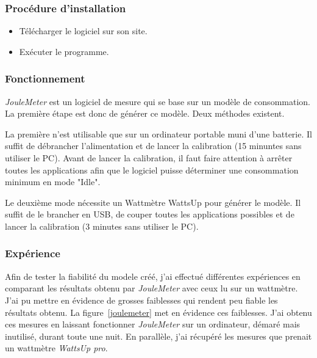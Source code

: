 \documentclass[a4paper, 11pt]{report}
\begin{document}
			\subsubsection{Procédure d'installation}
\begin{itemize}
	\item Télécharger le logiciel sur son site.
	\item Exécuter le programme.
\end{itemize}

			\subsubsection{Fonctionnement}
\textit{JouleMeter} est un logiciel de mesure qui se base sur un modèle de consommation. La première étape est donc de générer ce modèle. Deux méthodes existent.

La première n’est utilisable que sur un ordinateur portable muni d’une batterie. Il suffit de débrancher l’alimentation et de lancer la calibration (15 minuntes sans utiliser le PC). Avant de lancer la calibration, il faut faire attention à arrêter toutes les applications afin que le logiciel puisse déterminer une consommation minimum en mode "Idle".

Le deuxième mode nécessite un Wattmètre WattsUp pour générer le modèle. Il suffit de le brancher en USB, de couper toutes les applications possibles et de lancer la calibration (3 minutes sans utiliser le PC).

			\subsubsection{Expérience}
Afin de tester la fiabilité du modele créé, j'ai effectué différentes expériences en comparant les résultats obtenu par \textit{JouleMeter} avec ceux lu sur un wattmètre. J'ai pu mettre en évidence de grosses faiblesses qui rendent peu fiable les résultats obtenu. La figure~\ref{joulemeter} met en évidence ces faiblesses. J'ai obtenu ces mesures en laissant fonctionner \textit{JouleMeter} sur un ordinateur, démaré mais inutilisé, durant toute une nuit. En parallèle, j'ai récupéré les mesures que prenait un wattmètre \textit{WattsUp pro}.
\end{document}
